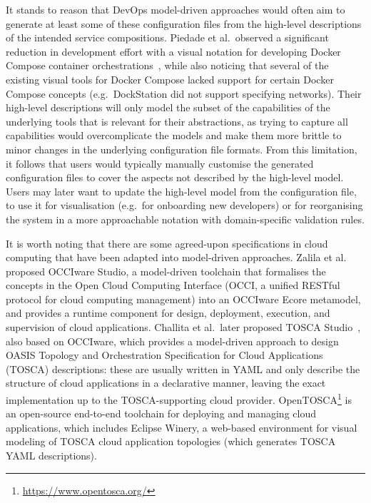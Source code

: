 \documentclass[twocolumn]{ceurart}
\begin{document}
It stands to reason that DevOps model-driven approaches would often aim to
generate at least some of these configuration files from the high-level
descriptions of the intended service compositions. Piedade et al.\ observed a
significant reduction in development effort with a visual notation for
developing Docker Compose container orchestrations~\cite{piedade_visual_2022},
while also noticing that several of the existing visual tools for Docker Compose
lacked support for certain Docker Compose concepts (e.g.\ DockStation did not
support specifying networks). Their high-level descriptions will only model the
subset of the capabilities of the underlying tools that is relevant for their
abstractions, as trying to capture all capabilities would overcomplicate the
models and make them more brittle to minor changes in the underlying
configuration file formats. From this limitation, it follows that users would
typically manually customise the generated configuration files to cover the
aspects not described by the high-level model. Users may later want to update
the high-level model from the configuration file, to use it for visualisation
(e.g.\ for onboarding new developers) or for reorganising the system in a more
approachable notation with domain-specific validation rules.

It is worth noting that there are some agreed-upon specifications in cloud
computing that have been adapted into model-driven approaches. Zalila et
al.~\cite{zalila_model-driven_2019} proposed OCCIware Studio, a model-driven
toolchain that formalises the concepts in the Open Cloud Computing Interface
(OCCI, a unified RESTful protocol for cloud computing management) into an
OCCIware Ecore metamodel, and provides a runtime component for design,
deployment, execution, and supervision of cloud applications. Challita et
al.\ later proposed TOSCA Studio~\cite{challita_model-based_2021}, also based on
OCCIware, which provides a model-driven approach to design OASIS Topology and
Orchestration Specification for Cloud Applications (TOSCA) descriptions: these
are usually written in YAML and only describe the structure of cloud
applications in a declarative manner, leaving the exact implementation up to the
TOSCA-supporting cloud provider.
OpenTOSCA\footnote{\url{https://www.opentosca.org/}} is an open-source
end-to-end toolchain for deploying and managing cloud applications, which
includes Eclipse Winery, a web-based environment for visual modeling of TOSCA
cloud application topologies (which generates TOSCA YAML descriptions).
\end{document}
